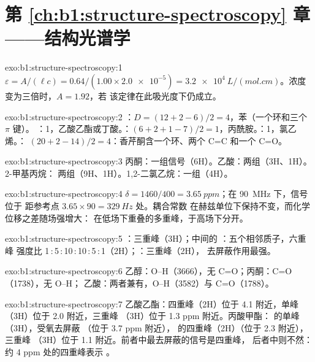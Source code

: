 \section*{第 \ref{ch:b1:structure-spectroscopy} 章——结构光谱学}

\begin{solution}{exo:b1:structure-spectroscopy:1}
$\varepsilon = A/(\ell c) = 0.64/(1.00 \times \num{2.0e-5}) =
\qty{3.2e4}{L/(mol.cm)}$。浓度变为三倍时，$A = 1.92$，若
该定律在此吸光度下仍成立。
\end{solution}

\begin{solution}{exo:b1:structure-spectroscopy:2}
：$D = (12 + 2 - 6)/2 = 4$，苯（一个环和三个 $\pi$ 键）。
：1，乙酸乙酯或丁酸。：$(6 + 2 + 1
- 7)/2 = 1$，丙酰胺。：1，氯乙烯。：
$(20 + 2 - 14)/2 = 4$：香芹酮含一个环、两个 C=C 和一个 C=O。
\end{solution}

\begin{solution}{exo:b1:structure-spectroscopy:3}
丙酮：一组信号（6H）。乙酸：两组（3H、1H）。2-甲基丙烷：
两组（9H、1H）。1,2-二氯乙烷：一组（4H）。
\end{solution}

\begin{solution}{exo:b1:structure-spectroscopy:4}
$\delta = 1460/400 = \qty{3.65}{ppm}$；在 \qty{90}{MHz} 下，信号位于
距参考点 $3.65 \times 90 = \qty{329}{Hz}$ 处。耦合常数
在赫兹单位下保持不变，而化学位移之差随场强增大：
在低场下重叠的多重峰，于高场下分开。
\end{solution}

\begin{solution}{exo:b1:structure-spectroscopy:5}
：三重峰（3H）；中间的 ：五个相邻质子，六重峰
强度比 1\,:\,5\,:\,10\,:\,10\,:\,5\,:\,1（2H）；：三重峰（2H），
去屏蔽作用最强。
\end{solution}

\begin{solution}{exo:b1:structure-spectroscopy:6}
乙醇：O--H（3666），无 C=O；丙酮：C=O（1738），无 O--H；
乙酸：两者兼有，O--H（3582）与 C=O（1788）。
\end{solution}

\begin{solution}{exo:b1:structure-spectroscopy:7}
乙酸乙酯：四重峰（2H）位于 4.1 附近，单峰（3H）位于 2.0 附近，三重峰
（3H）位于 1.3 ppm 附近。丙酸甲酯： 的单峰（3H），受氧去屏蔽
（位于 3.7 ppm 附近）， 的四重峰（2H）（位于 2.3 附近），三重峰
（3H）位于 1.1 附近。前者中最去屏蔽的信号是四重峰，
后者中则不然：约 4 ppm 处的四重峰表示 。
\end{solution}

